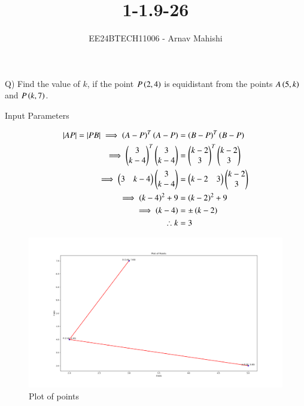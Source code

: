 \documentclass[journal]{IEEEtran}
\begin{document}

\vspace{3cm}

\title{1-1.9-26}
\author{EE24BTECH11006 - Arnav Mahishi}
{\let\newpage\relax\maketitle}

\renewcommand{\thefigure}{\theenumi}
\renewcommand{\thetable}{\theenumi}
\setlength{\intextsep}{10pt} %


\renewcommand{\thetable}{\theenumi}
Q) Find the value of $k$, if the point $P\left(2,4\right)$ is equidistant from the points $A\left(5,k\right)$ and $P\left(k,7\right)$.\\

\begin{table}[h!]    
  \centering
  
  \caption{Input Parameters}
\end{table}
\begin{align}
\left\vert AP\right\vert=\left\vert PB\right\vert\implies
\left(A-P\right)^T\left(A-P\right)&=\left(B-P\right)^T\left(B-P\right)\\
\implies\begin{pmatrix}3\\k-4\end{pmatrix}^T\begin{pmatrix}3\\k-4\end{pmatrix}&=\begin{pmatrix}k-2\\3\end{pmatrix}^T\begin{pmatrix}k-2\\3\end{pmatrix}\\
\implies\begin{pmatrix}3&k-4\end{pmatrix}\begin{pmatrix}3\\k-4\end{pmatrix}&=\begin{pmatrix}k-2&3\end{pmatrix}\begin{pmatrix}k-2\\3\end{pmatrix}\\
\implies\left(k-4\right)^2+9&=\left(k-2\right)^2+9\\
\implies\left(k-4\right)&=\pm\left(k-2\right)\\
\therefore k&=3
\end{align}
\begin{figure}[h!]
   \centering
   \includegraphics[width=0.7\linewidth]{figs/Figure_1.png}
   \caption{Plot of points}
   \label{stemplot}
\end{figure}
\end{document}
